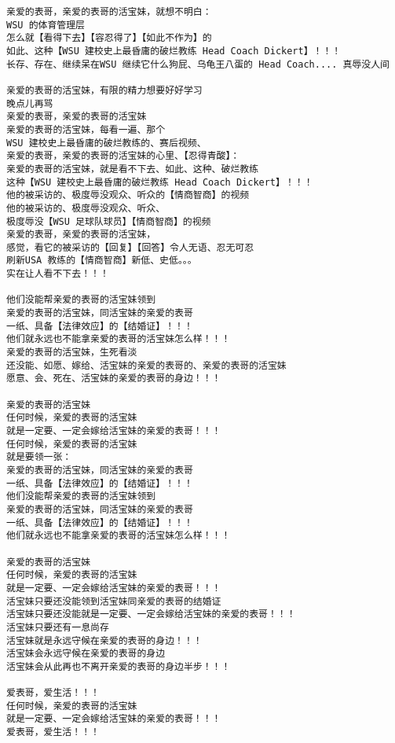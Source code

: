 \documentclass[9pt, b5paper]{article}
\begin{document}
\begin{verbatim}
亲爱的表哥，亲爱的表哥的活宝妹，就想不明白：
WSU 的体育管理层
怎么就【看得下去】【容忍得了】【如此不作为】的
如此、这种【WSU 建校史上最昏庸的破烂教练 Head Coach Dickert】！！！
长存、存在、继续呆在WSU 继续它什么狗屁、乌龟王八蛋的 Head Coach.... 真辱没人间

亲爱的表哥的活宝妹，有限的精力想要好好学习
晚点儿再骂
亲爱的表哥，亲爱的表哥的活宝妹
亲爱的表哥的活宝妹，每看一遍、那个
WSU 建校史上最昏庸的破烂教练的、赛后视频、
亲爱的表哥，亲爱的表哥的活宝妹的心里、【忍得青酸】：
亲爱的表哥的活宝妹，就是看不下去、如此、这种、破烂教练
这种【WSU 建校史上最昏庸的破烂教练 Head Coach Dickert】！！！
他的被采访的、极度辱没观众、听众的【情商智商】的视频
他的被采访的、极度辱没观众、听众、
极度辱没【WSU 足球队球员】【情商智商】的视频
亲爱的表哥，亲爱的表哥的活宝妹，
感觉，看它的被采访的【回复】【回答】令人无语、忍无可忍
刷新USA 教练的【情商智商】新低、史低。。。
实在让人看不下去！！！

他们没能帮亲爱的表哥的活宝妹领到
亲爱的表哥的活宝妹，同活宝妹的亲爱的表哥
一纸、具备【法律效应】的【结婚证】！！！
他们就永远也不能拿亲爱的表哥的活宝妹怎么样！！！
亲爱的表哥的活宝妹，生死看淡
还没能、如愿、嫁给、活宝妹的亲爱的表哥的、亲爱的表哥的活宝妹
愿意、会、死在、活宝妹的亲爱的表哥的身边！！！

亲爱的表哥的活宝妹
任何时候，亲爱的表哥的活宝妹
就是一定要、一定会嫁给活宝妹的亲爱的表哥！！！
任何时候，亲爱的表哥的活宝妹
就是要领一张：
亲爱的表哥的活宝妹，同活宝妹的亲爱的表哥
一纸、具备【法律效应】的【结婚证】！！！
他们没能帮亲爱的表哥的活宝妹领到
亲爱的表哥的活宝妹，同活宝妹的亲爱的表哥
一纸、具备【法律效应】的【结婚证】！！！
他们就永远也不能拿亲爱的表哥的活宝妹怎么样！！！

亲爱的表哥的活宝妹
任何时候，亲爱的表哥的活宝妹
就是一定要、一定会嫁给活宝妹的亲爱的表哥！！！
活宝妹只要还没能领到活宝妹同亲爱的表哥的结婚证
活宝妹只要还没能就是一定要、一定会嫁给活宝妹的亲爱的表哥！！！
活宝妹只要还有一息尚存
活宝妹就是永远守候在亲爱的表哥的身边！！！
活宝妹会永远守候在亲爱的表哥的身边
活宝妹会从此再也不离开亲爱的表哥的身边半步！！！

爱表哥，爱生活！！！
任何时候，亲爱的表哥的活宝妹
就是一定要、一定会嫁给活宝妹的亲爱的表哥！！！
爱表哥，爱生活！！！
\end{verbatim}
\end{document}
